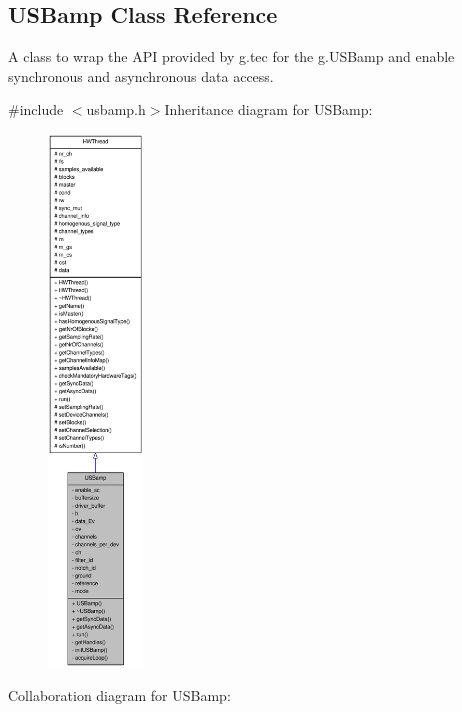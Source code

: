 \hypertarget{class_u_s_bamp}{
\subsection{USBamp Class Reference}
\label{class_u_s_bamp}
}


A class to wrap the API provided by g.tec for the g.USBamp and enable synchronous and asynchronous data access.  


{\ttfamily \#include $<$usbamp.h$>$}Inheritance diagram for USBamp:\nopagebreak
\begin{figure}[H]
\begin{center}
\leavevmode
\includegraphics[height=400pt]{class_u_s_bamp__inherit__graph}
\end{center}
\end{figure}
Collaboration diagram for USBamp:\nopagebreak
